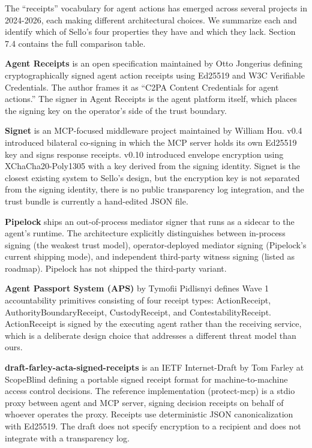 \documentclass[
  11pt,
]{article}
\begin{document}
The ``receipts'' vocabulary for agent actions has emerged across several
projects in 2024-2026, each making different architectural choices. We
summarize each and identify which of Sello's four properties they have
and which they lack. Section 7.4 contains the full comparison table.

\textbf{Agent Receipts} \citep{agentreceipts} is an open specification
maintained by Otto Jongerius defining cryptographically signed agent
action receipts using Ed25519 and W3C Verifiable Credentials. The author
frames it as ``C2PA Content Credentials for agent actions.'' The signer
in Agent Receipts is the agent platform itself, which places the signing
key on the operator's side of the trust boundary.

\textbf{Signet} \citep{signet} is an MCP-focused middleware project
maintained by William Hou. v0.4 introduced bilateral co-signing in which
the MCP server holds its own Ed25519 key and signs response receipts.
v0.10 introduced envelope encryption using XChaCha20-Poly1305 with a key
derived from the signing identity. Signet is the closest existing system
to Sello's design, but the encryption key is not separated from the
signing identity, there is no public transparency log integration, and
the trust bundle is currently a hand-edited JSON file.

\textbf{Pipelock} \citep{pipelock} ships an out-of-process mediator
signer that runs as a sidecar to the agent's runtime. The architecture
explicitly distinguishes between in-process signing (the weakest trust
model), operator-deployed mediator signing (Pipelock's current shipping
mode), and independent third-party witness signing (listed as roadmap).
Pipelock has not shipped the third-party variant.

\textbf{Agent Passport System (APS)} \citep{aps} by Tymofii Pidlisnyi
defines Wave 1 accountability primitives consisting of four receipt
types: ActionReceipt, AuthorityBoundaryReceipt, CustodyReceipt, and
ContestabilityReceipt. ActionReceipt is signed by the executing agent
rather than the receiving service, which is a deliberate design choice
that addresses a different threat model than ours.

\textbf{draft-farley-acta-signed-receipts} \citep{farley-acta} is an
IETF Internet-Draft by Tom Farley at ScopeBlind defining a portable
signed receipt format for machine-to-machine access control decisions.
The reference implementation (protect-mcp) is a stdio proxy between
agent and MCP server, signing decision receipts on behalf of whoever
operates the proxy. Receipts use deterministic JSON canonicalization
with Ed25519. The draft does not specify encryption to a recipient and
does not integrate with a transparency log.
\end{document}
